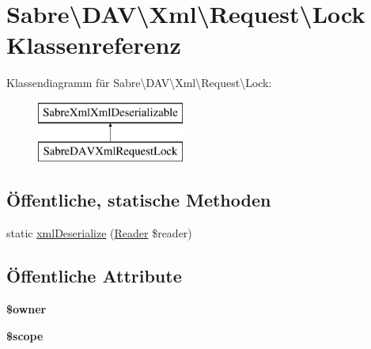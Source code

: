 \hypertarget{class_sabre_1_1_d_a_v_1_1_xml_1_1_request_1_1_lock}{}\section{Sabre\textbackslash{}D\+AV\textbackslash{}Xml\textbackslash{}Request\textbackslash{}Lock Klassenreferenz}
\label{class_sabre_1_1_d_a_v_1_1_xml_1_1_request_1_1_lock}
Klassendiagramm für Sabre\textbackslash{}D\+AV\textbackslash{}Xml\textbackslash{}Request\textbackslash{}Lock\+:\begin{figure}[H]
\begin{center}
\leavevmode
\includegraphics[height=2.000000cm]{class_sabre_1_1_d_a_v_1_1_xml_1_1_request_1_1_lock}
\end{center}
\end{figure}
\subsection*{Öffentliche, statische Methoden}
\begin{DoxyCompactItemize}
\item 
static \mbox{\hyperlink{class_sabre_1_1_d_a_v_1_1_xml_1_1_request_1_1_lock_a0e54c2ba5474db2734178358248d02ac}{xml\+Deserialize}} (\mbox{\hyperlink{class_sabre_1_1_xml_1_1_reader}{Reader}} \$reader)
\end{DoxyCompactItemize}
\subsection*{Öffentliche Attribute}
\begin{DoxyCompactItemize}
\item 
\mbox{\label{class_sabre_1_1_d_a_v_1_1_xml_1_1_request_1_1_lock_aaf046286affd8af699cb7a1862ddc939}} 
{\bfseries \$owner}
\item 
\mbox{\label{class_sabre_1_1_d_a_v_1_1_xml_1_1_request_1_1_lock_a3f6ea6d0595a28b046e649911f6122e4}} 
{\bfseries \$scope}
\end{DoxyCompactItemize}



